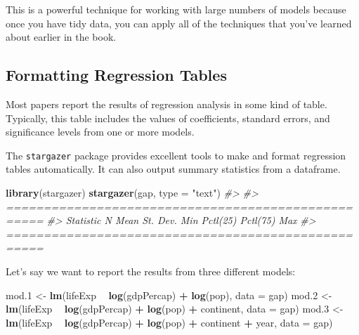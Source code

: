 \documentclass[
]{book}
\newenvironment{Shaded}{\begin{snugshade}}{\end{snugshade}}
\newcommand{\CommentTok}[1]{\textcolor[rgb]{0.56,0.35,0.01}{\textit{#1}}}
\newcommand{\DataTypeTok}[1]{\textcolor[rgb]{0.13,0.29,0.53}{#1}}
\newcommand{\FloatTok}[1]{\textcolor[rgb]{0.00,0.00,0.81}{#1}}
\newcommand{\KeywordTok}[1]{\textcolor[rgb]{0.13,0.29,0.53}{\textbf{#1}}}
\newcommand{\NormalTok}[1]{#1}
\newcommand{\OperatorTok}[1]{\textcolor[rgb]{0.81,0.36,0.00}{\textbf{#1}}}
\newcommand{\StringTok}[1]{\textcolor[rgb]{0.31,0.60,0.02}{#1}}
\begin{document}
This is a powerful technique for working with large numbers of models because once you have tidy data, you can apply all of the techniques that you've learned about earlier in the book.

\hypertarget{formatting-regression-tables}{%
\subsection{Formatting Regression Tables}\label{formatting-regression-tables}}

Most papers report the results of regression analysis in some kind of table. Typically, this table includes the values of coefficients, standard errors, and significance levels from one or more models.

The \texttt{stargazer} package provides excellent tools to make and format regression tables automatically. It can also output summary statistics from a dataframe.

\begin{Shaded}
\begin{Highlighting}[]
\KeywordTok{library}\NormalTok{(stargazer)}
\KeywordTok{stargazer}\NormalTok{(gap, }\DataTypeTok{type =} \StringTok{"text"}\NormalTok{)}
\CommentTok{#> }
\CommentTok{#> ===================================================}
\CommentTok{#> Statistic N Mean St. Dev. Min Pctl(25) Pctl(75) Max}
\CommentTok{#> ===================================================}
\end{Highlighting}
\end{Shaded}

Let's say we want to report the results from three different models:

\begin{Shaded}
\begin{Highlighting}[]
\NormalTok{mod}\FloatTok{.1}\NormalTok{ <-}\StringTok{ }\KeywordTok{lm}\NormalTok{(lifeExp }\OperatorTok{~}\StringTok{ }\KeywordTok{log}\NormalTok{(gdpPercap) }\OperatorTok{+}\StringTok{ }\KeywordTok{log}\NormalTok{(pop), }\DataTypeTok{data =}\NormalTok{ gap)}
\NormalTok{mod}\FloatTok{.2}\NormalTok{ <-}\StringTok{ }\KeywordTok{lm}\NormalTok{(lifeExp }\OperatorTok{~}\StringTok{ }\KeywordTok{log}\NormalTok{(gdpPercap) }\OperatorTok{+}\StringTok{ }\KeywordTok{log}\NormalTok{(pop) }\OperatorTok{+}\StringTok{ }\NormalTok{continent, }\DataTypeTok{data =}\NormalTok{ gap)}
\NormalTok{mod}\FloatTok{.3}\NormalTok{ <-}\StringTok{ }\KeywordTok{lm}\NormalTok{(lifeExp }\OperatorTok{~}\StringTok{ }\KeywordTok{log}\NormalTok{(gdpPercap) }\OperatorTok{+}\StringTok{ }\KeywordTok{log}\NormalTok{(pop) }\OperatorTok{+}\StringTok{ }\NormalTok{continent }\OperatorTok{+}\StringTok{ }\NormalTok{year, }\DataTypeTok{data =}\NormalTok{ gap)}
\end{Highlighting}
\end{Shaded}
\end{document}
